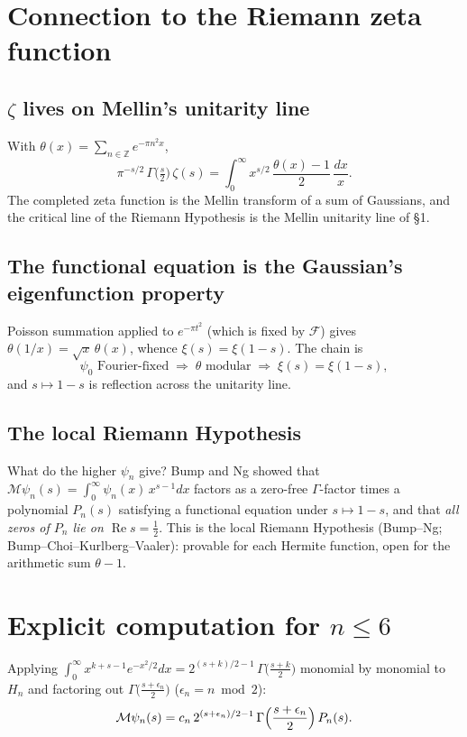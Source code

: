 \documentclass[11pt]{article}
\theoremstyle{remark}
\newcommand{\M}{\mathcal{M}}
\newcommand{\F}{\mathcal{F}}
\begin{document}
\section{Connection to the Riemann zeta function}

\subsection{$\zeta$ lives on Mellin's unitarity line}
With $\theta(x) = \sum_{n \in \mathbb{Z}} e^{-\pi n^2 x}$,
\begin{equation}
\pi^{-s/2}\, \Gamma\bigl(\tfrac{s}{2}\bigr)\, \zeta(s)
= \int_0^\infty x^{s/2}\, \frac{\theta(x) - 1}{2}\, \frac{dx}{x}.
\end{equation}
The completed zeta function is the Mellin transform of a sum of Gaussians, and the critical line of the Riemann Hypothesis is the Mellin unitarity line of \S1.

\subsection{The functional equation is the Gaussian's eigenfunction property}
Poisson summation applied to $e^{-\pi t^2}$ (which is fixed by $\F$) gives $\theta(1/x) = \sqrt{x}\,\theta(x)$, whence $\xi(s) = \xi(1-s)$. The chain is
\[
\psi_0 \text{ Fourier-fixed} \;\Longrightarrow\; \theta \text{ modular} \;\Longrightarrow\; \xi(s) = \xi(1-s),
\]
and $s \mapsto 1-s$ is reflection across the unitarity line.

\subsection{The local Riemann Hypothesis}
What do the higher $\psi_n$ give? Bump and Ng showed that $\M\psi_n(s) = \int_0^\infty \psi_n(x)\, x^{s-1} dx$ factors as a zero-free $\Gamma$-factor times a polynomial $P_n(s)$ satisfying a functional equation under $s \mapsto 1-s$, and that \emph{all zeros of $P_n$ lie on $\operatorname{Re} s = \tfrac12$}. This is the local Riemann Hypothesis (Bump--Ng; Bump--Choi--Kurlberg--Vaaler): provable for each Hermite function, open for the arithmetic sum $\theta - 1$.

\section{Explicit computation for $n \le 6$}

Applying $\int_0^\infty x^{k+s-1} e^{-x^2/2} dx = 2^{(s+k)/2 - 1}\, \Gamma\bigl(\frac{s+k}{2}\bigr)$ monomial by monomial to $H_n$ and factoring out $\Gamma\bigl(\frac{s + \epsilon_n}{2}\bigr)$ ($\epsilon_n = n \bmod 2$):
\begin{equation}
\M\psi_n(s) = c_n\, 2^{(s+\epsilon_n)/2 - 1}\, \Gamma\Bigl(\frac{s+\epsilon_n}{2}\Bigr)\, P_n(s).
\end{equation}
\end{document}
